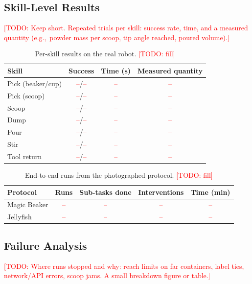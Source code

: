 \documentclass[letterpaper, 10pt, journal, twoside]{IEEEtran}}
\newcommand{\todo}[1]{\textcolor{red}{[TODO: #1]}}
\newcommand{\tbd}{\textcolor{red}{--}}
\newcommand{\eg}{e.g.,\ }
\begin{document}
\subsection{Skill-Level Results}
\todo{Keep short. Repeated trials per skill: success rate, time, and a
measured quantity (\eg powder mass per scoop, tip angle reached, poured
volume).}

\begin{table}[t]
  \caption{Per-skill results on the real robot. \todo{fill}}
  \label{tab:skill_results}
  \centering
  \footnotesize
  \begin{tabular}{@{}lccc@{}}
    \toprule
    Skill & Success & Time (s) & Measured quantity \\
    \midrule
    Pick (beaker/cup) & \tbd/\tbd & \tbd & \tbd \\
    Pick (scoop)      & \tbd/\tbd & \tbd & \tbd \\
    Scoop             & \tbd/\tbd & \tbd & \tbd \\
    Dump              & \tbd/\tbd & \tbd & \tbd \\
    Pour              & \tbd/\tbd & \tbd & \tbd \\
    Stir              & \tbd/\tbd & \tbd & \tbd \\
    Tool return       & \tbd/\tbd & \tbd & \tbd \\
    \bottomrule
  \end{tabular}
\end{table}

\begin{table}[t]
  \caption{End-to-end runs from the photographed protocol. \todo{fill}}
  \label{tab:e2e}
  \centering
  \footnotesize
  \begin{tabular}{@{}lcccc@{}}
    \toprule
    Protocol & Runs & Sub-tasks done & Interventions & Time (min) \\
    \midrule
    Magic Beaker & \tbd & \tbd & \tbd & \tbd \\
    Jellyfish    & \tbd & \tbd & \tbd & \tbd \\
    \bottomrule
  \end{tabular}
\end{table}

\subsection{Failure Analysis}
\todo{Where runs stopped and why: reach limits on far containers, label
ties, network/API errors, scoop jams. A small breakdown figure or table.}
\end{document}
